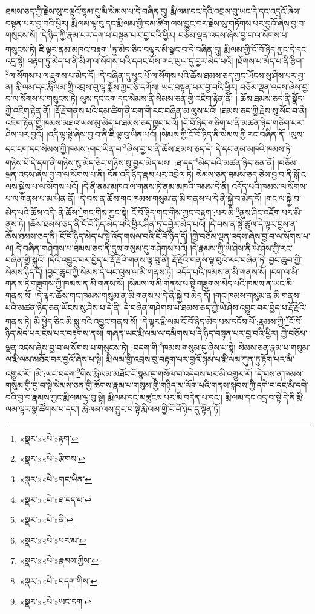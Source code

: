 ཐམས་ཅད་ཀྱི་རྗེས་སུ་བལྟའོ་སྙམ་དུ་མི་སེམས་པ་དེ་བཞིན་དུ། རྨི་ལམ་དང་དེའི་འབྲས་བུ་ཡང་དེ་དང་འདྲའོ་ཞེས་བསྟན་པར་བྱ་བའི་ཕྱིར། རྨི་ལམ་ལྟ་བུ་དང་རྨི་ལམ་གྱི་དམ་ཚིག་ལས་བྱུང་བར་རྗེས་སུ་གཏོགས་པར་བྱའོ་ཞེས་བྱ་བ་གསུངས་སོ། །དེ་ཉིད་ཀྱི་རྣམ་པར་དག་པ་བསྟན་པར་བྱ་བའི་ཕྱིར། བཅོམ་ལྡན་འདས་ཞེས་བྱ་བ་ལ་སོགས་པ་གསུངས་ཏེ། ཇི་ལྟར་ནམ་མཁའ་བརྟག་\footnote{«སྣར་»«པེ་»རྟག་}ཏུ་མེད་ཅིང་བལྟར་མི་སྣང་བ་དེ་བཞིན་དུ། རྨི་ལམ་གྱི་ངོ་བོ་ཉིད་ཀྱང་དེ་དང་འདྲ་སྟེ། བརྟག་ཏུ་མེད་པ་ནི་མིག་ལ་སོགས་པའི་དབང་པོས་གང་ཡུལ་དུ་བྱར་མེད་པའོ། །ཐོགས་པ་མེད་པ་ནི་རྩིག་\footnote{«སྣར་»«པེ་»རྩིགས་}ལ་སོགས་པ་ལ་རྡུགས་པ་མེད་དོ། །དེ་བཞིན་དུ་ཕུང་པོ་ལ་སོགས་པའི་ཆོས་ཐམས་ཅད་ཀྱང་ཡོངས་སུ་ཤེས་པར་བྱ་ན། རྨི་ལམ་དང་རྨི་ལམ་གྱི་འབྲས་བུ་ལྟ་སྨོས་ཀྱང་ཅི་དགོས། ཡང་བསྟན་པར་བྱ་བའི་ཕྱིར། བཅོམ་ལྡན་འདས་ཞེས་བྱ་བ་ལ་སོགས་པ་གསུངས་ཏེ། ལུས་དང་ངག་དང་སེམས་ནི་སེམས་ཅན་གྱི་འཇིག་རྟེན་ནོ། །
ཆོས་ཐམས་ཅད་ནི་སྣོད་ཀྱི་འཇིག་རྟེན་ནོ། །རྡོ་རྗེ་གནས་པའི་དམ་ཚིག་ནི་ངག་གི་རང་བཞིན་མ་ལུས་པའོ། །ཐམས་ཅད་ཀྱི་རྗེས་སུ་སོང་བ་ནི། འཇིག་རྟེན་གྱི་ཁམས་མཐའ་ཡས་མུ་མེད་པ་ཐམས་ཅད་ཁྱབ་པའོ། །ངོ་བོ་ཉིད་གཅིག་པ་ནི་མཚན་ཉིད་གཅིག་པར་ཤེས་པར་བྱའོ། །འདི་ལྟ་སྟེ་ཞེས་བྱ་བ་ནི་ཇི་ལྟ་བུ་ཡིན་པའོ། །སེམས་ཀྱི་ངོ་བོ་ཉིད་ནི་སེམས་ཀྱི་རང་བཞིན་ནོ། །ལུས་དང་ངག་དང་སེམས་ཀྱི་ཁམས་:གང་ཡིན་པ་\footnote{«སྣར་»«པེ་»གང་ཡིན་}ཞེས་བྱ་བ་ནི་ཆོས་ཐམས་ཅད་དེ། དེ་དང་ནམ་མཁའི་ཁམས་ཏེ་གཉིས་པོ་དེ་དག་ནི་གཉིས་སུ་མེད་ཅིང་གཉིས་སུ་བྱར་མེད་པས། :ཐ་དད་\footnote{«སྣར་»«པེ་»ཐ་དད་པ་}མེད་པའི་མཚན་ཉིད་ཅན་ནོ། །བཅོམ་ལྡན་འདས་ཞེས་བྱ་བ་ལ་སོགས་པ་ནི། དོན་འདི་ཉིད་རྣམ་པར་འབྲེལ་ཏེ། སེམས་ཅན་ཐམས་ཅད་ཅེས་བྱ་བ་ནི་སྒོ་ང་ལས་སྐྱེས་པ་ལ་སོགས་པའོ། །དེ་ནི་ནམ་མཁའ་ལ་གནས་ཏེ་ནམ་མཁའི་ཁམས་དེ་ནི། འདོད་པའི་ཁམས་ལ་སོགས་པ་ལ་གནས་པ་མ་ཡིན་ནོ། །དེ་བས་ན་ཆོས་གང་ཁམས་གསུམ་ན་མི་གནས་པ་དེ་ནི་སྐྱེ་བ་མེད་དོ། །གང་ལ་སྐྱེ་བ་མེད་པའི་ཆོས་འདི་:ནི་ཆོས་\footnote{«སྣར་»«པེ་»ནི་}གང་གིས་ཀྱང་སྟེ། ངོ་བོ་ཉིད་གང་གིས་ཀྱང་བརྟག་:པར་མི་\footnote{«སྣར་»«པེ་»པར་མ་}ནུས་ཤིང་འཇོག་པར་མི་ནུས་ཏེ། །ཆོས་ཐམས་ཅད་ནི་ངོ་བོ་ཉིད་མེད་པའི་ཕྱིར་ཤིན་ཏུ་དབྱེར་མེད་པའོ། །དེ་བས་ན་སྟེ་ཚུལ་དེ་ལྟར་བྱས་ན་ཆོས་ཐམས་ཅད་ནི། ངོ་བོ་ཉིད་མེད་པ་སྟེ་འོད་གསལ་བའི་ངོ་བོ་ཉིད་དོ། །ཀྱེ་བཅོམ་ལྡན་འདས་ཞེས་བྱ་བ་ལ་སོགས་པ་ལ། དེ་བཞིན་གཤེགས་པ་ཐམས་ཅད་ནི་དུས་གསུམ་དུ་གཤེགས་པའོ། །དེ་རྣམས་ཀྱི་ཡེ་ཤེས་ནི་ཡེ་ཤེས་ཀྱི་རང་བཞིན་གྱི་སྐུའོ། །དེའི་འབྱུང་བར་བྱེད་པ་རྡོ་རྗེའི་གནས་ལྟ་བུ་ནི། རྡོ་རྗེའི་གནས་ལྟ་བུའི་རང་བཞིན་ཏེ། བྱང་ཆུབ་ཀྱི་སེམས་ཉིད་དོ། །བྱང་ཆུབ་ཀྱི་སེམས་དེ་ཡང་ལུས་ལ་མི་གནས་ཏེ། འདོད་པའི་ཁམས་ན་མི་གནས་སོ། །ངག་ལ་མི་གནས་ཏེ་གཟུགས་ཀྱི་ཁམས་ན་མི་གནས་སོ། །སེམས་ལ་མི་གནས་པ་སྟེ་གཟུགས་མེད་པའི་ཁམས་ན་ཡང་མི་གནས་སོ། །དེ་ལྟར་ཆོས་གང་ཁམས་གསུམ་ན་མི་གནས་པ་དེ་ནི་སྐྱེ་བ་མེད་དོ། །གང་ཁམས་གསུམ་ན་མི་གནས་པའི་མཚན་ཉིད་ཅན་ཡོངས་སུ་ཤེས་པ་དེ་ནི། དེ་བཞིན་གཤེགས་པ་ཐམས་ཅད་ཀྱི་ཡེ་ཤེས་འབྱུང་བར་བྱེད་པ་རྡོ་རྗེའི་གནས་ཏེ། མི་ཕྱེད་ཅིང་མི་སླུ་བའི་འབྱུང་གནས་སོ། །དེ་ལྟར་རྨི་ལམ་ངོ་བོ་ཉིད་མེད་པས་དངོས་པོ་:རྣམས་ཀྱི་\footnote{«སྣར་»«པེ་»རྣམས་ཀྱིས་}ངོ་བོ་ཉིད་མེད་པར་ངེས་པར་བརྟགས་ནས། གཞན་ཡང་རྨི་ལམ་ལ་དམིགས་པ་དེ་ཉིད་བསྟན་པར་བྱ་བའི་ཕྱིར། ཀྱེ་བཅོམ་ལྡན་འདས་ཞེས་བྱ་བ་ལ་སོགས་པ་གསུངས་ཏེ། :བདག་གི་\footnote{«སྣར་»«པེ་»བདག་གིས་}ཁམས་གསུམ་དུ་ཞེས་པ་སྟེ། སེམས་ཅན་རྣམ་པ་གསུམ་ལ་རྨི་ལམ་མཐོང་བར་བྱའོ་ཞེས་པ་སྟེ། རྨི་ལམ་གྱི་འབྲས་བུ་བརྟག་པར་བྱའོ་སྙམ་པ་རྨི་ལམ་ཀུན་ཏུ་རྟོག་པར་མི་འགྱུར་རོ། །མི་:ཡང་བདག་\footnote{«སྣར་»«པེ་»ཡང་དག་}གིས་རྨི་ལམ་མཐོང་ངོ་སྙམ་དུ་གསོལ་བ་འདེབས་པར་མི་འགྱུར་རོ། །དེ་བས་ན་ཁམས་གསུམ་གྱི་བྱ་བ་སྟེ་སེམས་ཅན་གྱི་ཚོགས་རྣམ་པ་གསུམ་གྱི་གཉིད་མ་ལོག་པའི་གནས་སྐབས་ཀྱི་དགེ་བ་དང་མི་དགེ་བའི་བྱ་བ་རྣམས་ཀྱང་རྨི་ལམ་ལྟ་བུ་སྟེ། རྨི་ལམ་དང་མཚུངས་པར་མི་བདེན་པ་དང་། རྨི་ལམ་དང་འདྲ་བ་སྟེ་དེ་ནི་རྨི་ལམ་ལྟར་སྣ་ཚོགས་པ་དང་། རྨི་ལམ་ལས་བྱུང་བ་སྟེ་རྨི་ལམ་གྱི་ངོ་བོ་ཉིད་དུ་སྟོན་ཏོ། 